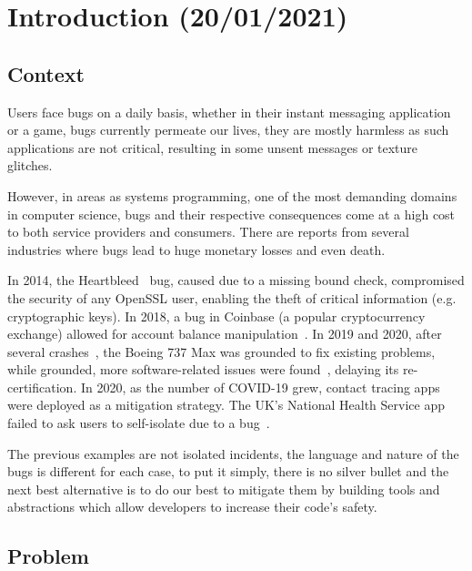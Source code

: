 \chapter{Introduction (20/01/2021)}\label{cha:introduction}

\section{Context}\label{sec:context}


Users face bugs on a daily basis, whether in their instant messaging application or a game,
bugs currently permeate our lives, they are mostly harmless as such applications are not critical,
resulting in some unsent messages or texture glitches.

However, in areas as systems programming, one of the most demanding domains in computer science,
bugs and their respective consequences come at a high cost to both service providers and consumers.
There are reports from several industries where bugs lead to huge monetary losses and even death.

In 2014, the Heartbleed~\autocite{Heartbleed} bug, caused due to a missing bound check,
compromised the security of any OpenSSL user, enabling the theft of critical information (e.g. cryptographic keys).
In 2018, a bug in Coinbase (a popular cryptocurrency exchange)
allowed for account balance manipulation~\autocite{Vicompany2018}.
In 2019 and 2020, after several crashes~\autocite{Campbell2019},
the Boeing 737 Max was grounded to fix existing problems, while grounded,
more software-related issues were
found~\autocite{Okane2019,Okane2020},
delaying its re-certification.
In 2020, as the number of COVID-19 grew,
contact tracing apps were deployed as a mitigation strategy.
The UK's National Health Service app failed to ask users to self-isolate due to a
bug~\autocite{Mageit2020}.

The previous examples are not isolated incidents, the language and nature of the bugs is different for each case,
to put it simply, there is no silver bullet and the next best alternative is to do our best to mitigate them by
building tools and abstractions which allow developers to increase their code's safety.

\section{Problem}

